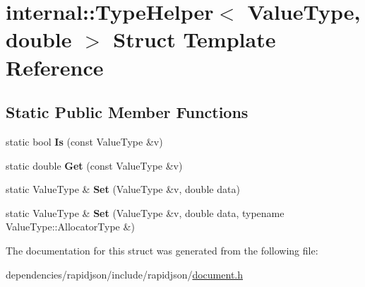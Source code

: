 \hypertarget{structinternal_1_1_type_helper_3_01_value_type_00_01double_01_4}{}\section{internal\+:\+:Type\+Helper$<$ Value\+Type, double $>$ Struct Template Reference}
\label{structinternal_1_1_type_helper_3_01_value_type_00_01double_01_4}
\subsection*{Static Public Member Functions}
\begin{DoxyCompactItemize}
\item 
\mbox{\label{structinternal_1_1_type_helper_3_01_value_type_00_01double_01_4_a6c265a3202beb9bd85ecc7896a8ab9dd}} 
static bool {\bfseries Is} (const Value\+Type \&v)
\item 
\mbox{\label{structinternal_1_1_type_helper_3_01_value_type_00_01double_01_4_ac55a96d2abd1dd6718a6cb3d6690aa38}} 
static double {\bfseries Get} (const Value\+Type \&v)
\item 
\mbox{\label{structinternal_1_1_type_helper_3_01_value_type_00_01double_01_4_a2b332dd6083278283289e107caff879b}} 
static Value\+Type \& {\bfseries Set} (Value\+Type \&v, double data)
\item 
\mbox{\label{structinternal_1_1_type_helper_3_01_value_type_00_01double_01_4_a69f7d942a569f3acdeb64127b2ecd9eb}} 
static Value\+Type \& {\bfseries Set} (Value\+Type \&v, double data, typename Value\+Type\+::\+Allocator\+Type \&)
\end{DoxyCompactItemize}


The documentation for this struct was generated from the following file\+:\begin{DoxyCompactItemize}
\item 
dependencies/rapidjson/include/rapidjson/\hyperlink{document_8h}{document.\+h}\end{DoxyCompactItemize}
